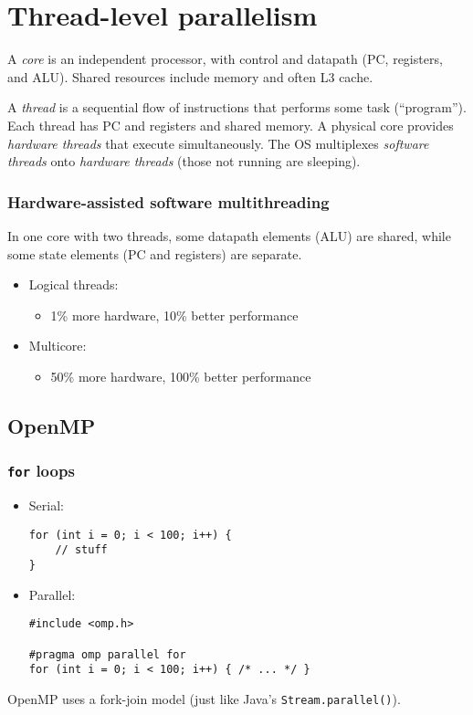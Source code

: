 \chapter{Thread-level parallelism}
A \emph{core} is an independent processor, with control and datapath (PC, registers, and ALU).
Shared resources include memory and often L3 cache.

A \emph{thread} is a sequential flow of instructions that performs some task (``program'').
Each thread has PC and registers and shared memory. A physical core provides \emph{hardware threads} that execute simultaneously.
The OS multiplexes \emph{software threads} onto \emph{hardware threads} (those not running are sleeping).

\subsection{Hardware-assisted software multithreading}
In one core with two threads, some datapath elements (ALU) are shared, while some state elements (PC and registers) are separate.

\begin{itemize}
	\item Logical threads:
		\begin{itemize}
			\item 1\% more hardware, 10\% better performance
		\end{itemize}
	\item Multicore:
		\begin{itemize}
			\item 50\% more hardware, 100\% better performance
		\end{itemize}
\end{itemize}

\section{OpenMP}
\subsection{\texttt{for} loops}
\begin{itemize}
	\item Serial:
\begin{verbatim}
for (int i = 0; i < 100; i++) {
	// stuff
}
\end{verbatim}
	\item Parallel:
\begin{verbatim}
#include <omp.h>

#pragma omp parallel for
for (int i = 0; i < 100; i++) { /* ... */ }
\end{verbatim}
\end{itemize}
OpenMP uses a fork-join model (just like Java's \texttt{Stream.parallel()}).
